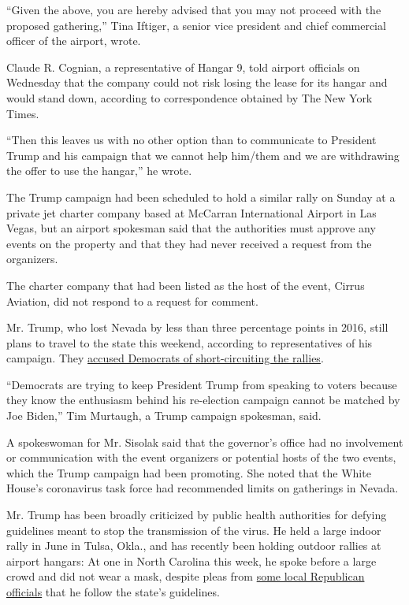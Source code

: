 ``Given the above, you are hereby advised that you may not proceed with
the proposed gathering,'' Tina Iftiger, a senior vice president and
chief commercial officer of the airport, wrote.

Claude R. Cognian, a representative of Hangar 9, told airport officials
on Wednesday that the company could not risk losing the lease for its
hangar and would stand down, according to correspondence obtained by The
New York Times.

``Then this leaves us with no other option than to communicate to
President Trump and his campaign that we cannot help him/them and we are
withdrawing the offer to use the hangar,'' he wrote.

The Trump campaign had been scheduled to hold a similar rally on Sunday
at a private jet charter company based at McCarran International Airport
in Las Vegas, but an airport spokesman said that the authorities must
approve any events on the property and that they had never received a
request from the organizers.

The charter company that had been listed as the host of the event,
Cirrus Aviation, did not respond to a request for comment.

Mr. Trump, who lost Nevada by less than three percentage points in 2016,
still plans to travel to the state this weekend, according to
representatives of his campaign. They
\href{https://twitter.com/AdamLaxalt/status/1303725097816076290?s=20}{accused
Democrats of short-circuiting the rallies}.

``Democrats are trying to keep President Trump from speaking to voters
because they know the enthusiasm behind his re-election campaign cannot
be matched by Joe Biden,'' Tim Murtaugh, a Trump campaign spokesman,
said.

A spokeswoman for Mr. Sisolak said that the governor's office had no
involvement or communication with the event organizers or potential
hosts of the two events, which the Trump campaign had been promoting.
She noted that the White House's coronavirus task force had recommended
limits on gatherings in Nevada.

Mr. Trump has been broadly criticized by public health authorities for
defying guidelines meant to stop the transmission of the virus. He held
a large indoor rally in June in Tulsa, Okla., and has recently been
holding outdoor rallies at airport hangars: At one in North Carolina
this week, he spoke before a large crowd and did not wear a mask,
despite pleas from
\href{https://journalnow.com/news/local/president-trump-should-wear-a-mask-during-his-visit-to-winston-salem-county-republican-says/article_551be240-ee3c-11ea-aaac-07490e3d44da.html\#1}{some
local Republican officials} that he follow the state's guidelines.

